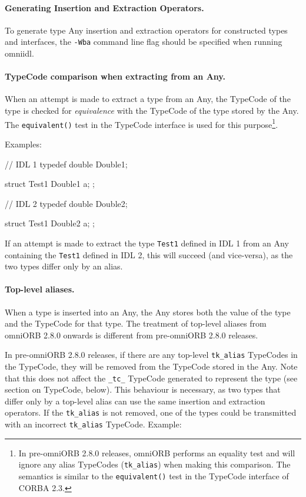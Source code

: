 \documentclass[11pt,twoside,a4paper]{book}
\newcommand{\type}[1]{\texttt{#1}}
\newcommand{\code}[1]{\texttt{#1}}
\newcommand{\op}[1]{\texttt{#1()}}
\begin{document}
\paragraph*{Generating Insertion and Extraction Operators.}
To generate type Any insertion and extraction operators for
constructed types and interfaces, the \texttt{-Wba} command line flag
should be specified when running omniidl.

\paragraph*{TypeCode comparison when extracting from an Any.}
When an attempt is made to extract a type from an Any, the TypeCode of
the type is checked for \emph{equivalence} with the TypeCode of the
type stored by the Any. The \op{equivalent} test in the TypeCode
interface is used for this purpose\footnote{In pre-omniORB 2.8.0
releases, omniORB performs an equality test and will ignore any alias
TypeCodes (\code{tk\_alias}) when making this comparison. The
semantics is similar to the \op{equivalent} test in the TypeCode
interface of CORBA 2.3.}.

Examples:

\begin{idllisting}
// IDL 1
typedef double Double1;

struct Test1 {
  Double1 a;
};
\end{idllisting}

\begin{idllisting}
// IDL 2
typedef double Double2;

struct Test1 {
  Double2 a;
};
\end{idllisting}
    
If an attempt is made to extract the type \type{Test1} defined in IDL
1 from an Any containing the \type{Test1} defined in IDL 2, this will
succeed (and vice-versa), as the two types differ only by an alias.

\paragraph*{Top-level aliases.}
When a type is inserted into an Any, the Any stores both the value of
the type and the TypeCode for that type. The treatment of top-level
aliases from omniORB 2.8.0 onwards is different from pre-omniORB 2.8.0
releases.

In pre-omniORB 2.8.0 releases, if there are any top-level
\code{tk\_alias} TypeCodes in the TypeCode, they will be removed from
the TypeCode stored in the Any. Note that this does not affect the
\code{\_tc\_} TypeCode generated to represent the type (see section on
TypeCode, below). This behaviour is necessary, as two types that
differ only by a top-level alias can use the same insertion and
extraction operators. If the \code{tk\_alias} is not removed, one of
the types could be transmitted with an incorrect \code{tk\_alias}
TypeCode. Example:
\end{document}
